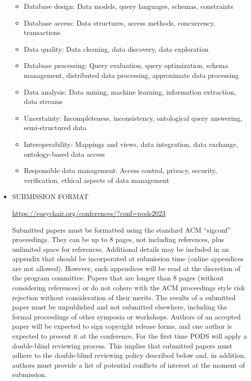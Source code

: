 \documentclass[prodmode,acmtecs]{acmsmall} %
\begin{document}
\begin{itemize}
\begin{itemize}\item  Database design: Data models, query languages, schemas, constraints 
\item  Database access: Data structures, access methods, concurrency, transactions 
\item  Data quality: Data cleaning, data discovery, data exploration 
\item  Database processing: Query evaluation, query optimization, schema management, distributed data processing, approximate data processing 
\item  Data analysis: Data mining, machine learning, information extraction, data streams 
\item  Uncertainty: Incompleteness, inconsistency, ontological query answering, semi-structured data 
\item  Interoperability: Mappings and views, data integration, data exchange, ontology-based data access 
\item  Responsible data management: Access control, privacy, security, verification, ethical aspects of data management
\end{itemize} 
\item  SUBMISSION FORMAT 
 
  \href{https://easychair.org/conferences/?conf=pods2023}{https://easychair.org/conferences/?conf=pods2023} 
 
  Submitted papers must be formatted using the standard ACM ``sigconf'' proceedings. They can be up to 8 pages, not including references, plus unlimited space for references. Additional details may be included in an appendix that should be incorporated at submission time (online appendices are not allowed). However, such appendices will be read at the discretion of the program committee. Papers that are longer than 8 pages (without considering references) or do not cohere with the ACM proceedings style risk rejection without consideration of their merits. The results of a submitted paper must be unpublished and not submitted elsewhere, including the formal proceedings of other symposia or workshops. Authors of an accepted paper will be expected to sign copyright release forms, and one author is expected to present it at the conference. For the first time PODS will apply a double-blind reviewing process. This implies that submitted papers must adhere to the double-blind reviewing policy described below and, in addition, authors must provide a list of potential conflicts of interest at the moment of submission. 
 

\end{itemize}
\end{document}
